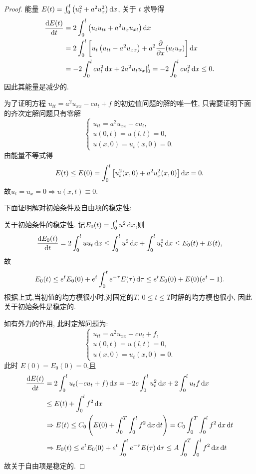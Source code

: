 \begin{proof}
  能量 $E(t)=\int_0^l\left(u_t^2+a^2u_x^2\right)\mathop{}\!\mathrm{d} x$, 关于 $t$ 求导得
  \begin{align*}
    \frac{\mathop{}\!\mathrm{d} E(t)}{\mathop{}\!\mathrm{d} t}
    & = 2\int_0^l\left(u_tu_{tt}+a^2u_xu_{xt}\right)\mathop{}\!\mathrm{d} x \\
    & = 2\int_0^l\left[u_t\left(u_{tt}-a^2u_{xx}\right)
        + a^2\frac{\partial}{\partial x}(u_tu_x)\right]\mathop{}\!\mathrm{d} x \\
    & = -2\int_0^lcu_t^2\mathop{}\!\mathrm{d} x+2a^2u_tu_x|_0^l=-2\int_0^lcu_t^2\mathop{}\!\mathrm{d} x\leq 0.
  \end{align*}
  因此其能量是减少的.
  
  为了证明方程 $u_{tt}=a^2u_{xx}-cu_t+f$ 的初边值问题的解的唯一性,
  只需要证明下面的齐次定解问题只有零解
  \[\begin{cases}
    u_{tt}=a^2u_{xx}-cu_t, \\
    u(0,t)=u(l,t)=0, \\
    u(x,0)=u_t(x,0)=0.
  \end{cases}\]
  由能量不等式得
  \[E(t)\leq E(0)=\int_0^l\left[u_t^2(x,0)+a^2u_x^2(x,0)\right]\mathop{}\!\mathrm{d} x = 0.\]
  故$u_t=u_x=0\Rightarrow u(x,t)\equiv 0$.
  
  下面证明解对初始条件及自由项的稳定性:

  \textbullet 关于初始条件的稳定性. 记$E_0(t)=\int_0^lu^2\mathop{}\!\mathrm{d} x$,则
  \[\frac{\mathop{}\!\mathrm{d} E_0(t)}{\mathop{}\!\mathrm{d} t}
    = 2\int_0^luu_t\mathop{}\!\mathrm{d} x\leq\int_0^lu^2\mathop{}\!\mathrm{d} x+\int_0^lu_t^2\mathop{}\!\mathrm{d} x\leq E_0(t)+E(t),\]
  故
  \[E_0(t) \leq e^tE_0(0)+e^t\int_0^te^{-\tau}E(\tau)\mathop{}\!\mathrm{d}\tau\leq e^tE_0(0)+E(0)(e^t-1).\]
  根据上式,当初值的均方模很小时,对固定的$T$, $0\leq t\leq T$时解的均方模也很小, 因此关于初始条件是稳定的.

  \textbullet 如有外力的作用, 此时定解问题为:
  \[\begin{cases}
    u_{tt}=a^2u_{xx}-cu_t+f, \\
    u(0,t)=u(l,t)=0, \\
    u(x,0)=u_t(x,0)=0.
  \end{cases}\]
  此时 $E(0)=E_0(0)=0$,且
  \[\begin{split}
    \frac{\diff E(t)}{\diff t}&=2\int_0^lu_t(-cu_t+f)\diff x=-2c\int_0^lu_t^2\diff x+2\int_0^lu_tf\diff x\\
    &\leq E(t)+\int_0^lf^2\diff x\\
    &\Rightarrow E(t)\leq C_0\left(E(0)+\int_0^T\int_0^lf^2\diff x\diff t\right)=C_0\int_0^T\int_0^lf^2\diff x\diff t\\
    &\Rightarrow E_0(t)\leq e^tE_0(0)+e^t\int_0^te^{-\tau}E(\tau)\diff\tau\leq A\int_0^T\int_0^lf^2\diff x\diff t
  \end{split}\]
  故关于自由项是稳定的.
\end{proof}


